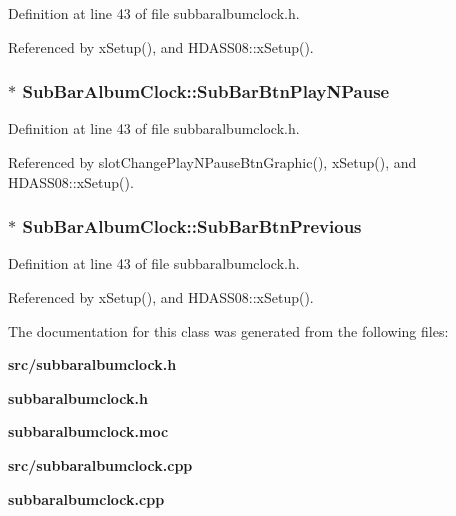 Definition at line 43 of file subbaralbumclock.h.

Referenced by x\-Setup(), and HDASS08::x\-Setup().
\subsubsection{ $\ast$ {\bf Sub\-Bar\-Album\-Clock::Sub\-Bar\-Btn\-Play\-NPause}}\label{classSubBarAlbumClock_SubBarAlbumClocko2}




Definition at line 43 of file subbaralbumclock.h.

Referenced by slot\-Change\-Play\-NPause\-Btn\-Graphic(), x\-Setup(), and HDASS08::x\-Setup().
\subsubsection{ $\ast$ {\bf Sub\-Bar\-Album\-Clock::Sub\-Bar\-Btn\-Previous}}\label{classSubBarAlbumClock_SubBarAlbumClocko1}




Definition at line 43 of file subbaralbumclock.h.

Referenced by x\-Setup(), and HDASS08::x\-Setup().

The documentation for this class was generated from the following files:\begin{CompactItemize}
\item 
{\bf src/subbaralbumclock.h}\item 
{\bf subbaralbumclock.h}\item 
{\bf subbaralbumclock.moc}\item 
{\bf src/subbaralbumclock.cpp}\item 
{\bf subbaralbumclock.cpp}\end{CompactItemize}
